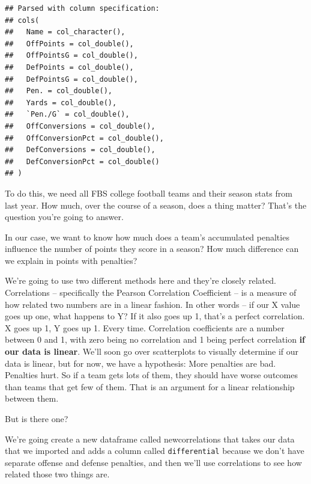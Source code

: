 \documentclass[]{book}
\newenvironment{Shaded}{\begin{snugshade}}{\end{snugshade}}
\newcommand{\KeywordTok}[1]{\textcolor[rgb]{0.13,0.29,0.53}{\textbf{#1}}}
\newcommand{\DataTypeTok}[1]{\textcolor[rgb]{0.13,0.29,0.53}{#1}}
\newcommand{\StringTok}[1]{\textcolor[rgb]{0.31,0.60,0.02}{#1}}
\newcommand{\OperatorTok}[1]{\textcolor[rgb]{0.81,0.36,0.00}{\textbf{#1}}}
\newcommand{\NormalTok}[1]{#1}
\begin{document}
\begin{verbatim}
## Parsed with column specification:
## cols(
##   Name = col_character(),
##   OffPoints = col_double(),
##   OffPointsG = col_double(),
##   DefPoints = col_double(),
##   DefPointsG = col_double(),
##   Pen. = col_double(),
##   Yards = col_double(),
##   `Pen./G` = col_double(),
##   OffConversions = col_double(),
##   OffConversionPct = col_double(),
##   DefConversions = col_double(),
##   DefConversionPct = col_double()
## )
\end{verbatim}

To do this, we need all FBS college football teams and their season
stats from last year. How much, over the course of a season, does a
thing matter? That's the question you're going to answer.

In our case, we want to know how much does a team's accumulated
penalties influence the number of points they score in a season? How
much difference can we explain in points with penalties?

We're going to use two different methods here and they're closely
related. Correlations -- specifically the Pearson Correlation
Coefficient -- is a measure of how related two numbers are in a linear
fashion. In other words -- if our X value goes up one, what happens to
Y? If it also goes up 1, that's a perfect correlation. X goes up 1, Y
goes up 1. Every time. Correlation coefficients are a number between 0
and 1, with zero being no correlation and 1 being perfect correlation
\textbf{if our data is linear}. We'll soon go over scatterplots to
visually determine if our data is linear, but for now, we have a
hypothesis: More penalties are bad. Penalties hurt. So if a team gets
lots of them, they should have worse outcomes than teams that get few of
them. That is an argument for a linear relationship between them.

But is there one?

We're going create a new dataframe called newcorrelations that takes our
data that we imported and adds a column called \texttt{differential}
because we don't have separate offense and defense penalties, and then
we'll use correlations to see how related those two things are.

\begin{Shaded}
\end{Shaded}
\end{document}
